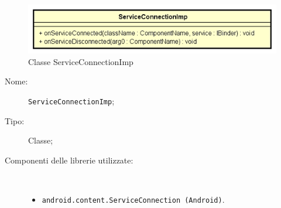 \documentclass[../DefinizioneDiProdotto.tex]{subfiles}
\begin{document}
    \begin{figure}[H]
        \centering
        \includegraphics{img/ServiceConnectionImp.png}
        \caption{Classe ServiceConnectionImp}\label{fig:model::ServiceConnectionImp} 
    \end{figure}
    \begin{description}
\item[Nome:] \texttt{ServiceConnectionImp};
\item[Tipo:] Classe;
\item[Componenti delle librerie utilizzate:] \
\begin{itemize}
\item \texttt{android.content.ServiceConnection (Android)}.


\end{itemize}
\end{description}
\end{document}
